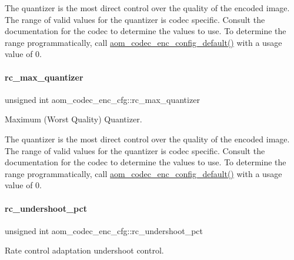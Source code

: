 The quantizer is the most direct control over the quality of the encoded image. The range of valid values for the quantizer is codec specific. Consult the documentation for the codec to determine the values to use. To determine the range programmatically, call \hyperlink{group__encoder_gabe456ab6f99bdebc47018779b75d2521}{aom\+\_\+codec\+\_\+enc\+\_\+config\+\_\+default()} with a usage value of 0. \mbox{\label{structaom__codec__enc__cfg_a8f8851455e06db026022d4b01671b122}} 
\paragraph{\texorpdfstring{rc\+\_\+max\+\_\+quantizer}{rc\_max\_quantizer}}
{\footnotesize\ttfamily unsigned int aom\+\_\+codec\+\_\+enc\+\_\+cfg\+::rc\+\_\+max\+\_\+quantizer}



Maximum (Worst Quality) Quantizer. 

The quantizer is the most direct control over the quality of the encoded image. The range of valid values for the quantizer is codec specific. Consult the documentation for the codec to determine the values to use. To determine the range programmatically, call \hyperlink{group__encoder_gabe456ab6f99bdebc47018779b75d2521}{aom\+\_\+codec\+\_\+enc\+\_\+config\+\_\+default()} with a usage value of 0. \mbox{\label{structaom__codec__enc__cfg_a8695946812f24f3719aed80cff00aa29}} 
\paragraph{\texorpdfstring{rc\+\_\+undershoot\+\_\+pct}{rc\_undershoot\_pct}}
{\footnotesize\ttfamily unsigned int aom\+\_\+codec\+\_\+enc\+\_\+cfg\+::rc\+\_\+undershoot\+\_\+pct}



Rate control adaptation undershoot control. 

